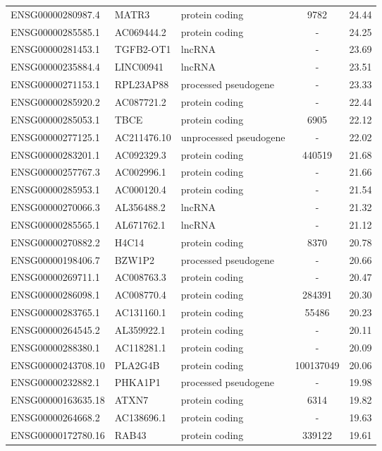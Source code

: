 \begin{longtable}[t]{lllcc}
\addlinespace
ENSG00000280987.4 & MATR3 & protein coding & 9782 & 24.44\\
ENSG00000285585.1 & AC069444.2 & protein coding & - & 24.25\\
ENSG00000281453.1 & TGFB2-OT1 & lncRNA & - & 23.69\\
ENSG00000235884.4 & LINC00941 & lncRNA & - & 23.51\\
ENSG00000271153.1 & RPL23AP88 & processed pseudogene & - & 23.33\\
\addlinespace
ENSG00000285920.2 & AC087721.2 & protein coding & - & 22.44\\
ENSG00000285053.1 & TBCE & protein coding & 6905 & 22.12\\
ENSG00000277125.1 & AC211476.10 & unprocessed pseudogene & - & 22.02\\
ENSG00000283201.1 & AC092329.3 & protein coding & 440519 & 21.68\\
ENSG00000257767.3 & AC002996.1 & protein coding & - & 21.66\\
\addlinespace
ENSG00000285953.1 & AC000120.4 & protein coding & - & 21.54\\
ENSG00000270066.3 & AL356488.2 & lncRNA & - & 21.32\\
ENSG00000285565.1 & AL671762.1 & lncRNA & - & 21.12\\
ENSG00000270882.2 & H4C14 & protein coding & 8370 & 20.78\\
ENSG00000198406.7 & BZW1P2 & processed pseudogene & - & 20.66\\
\addlinespace
ENSG00000269711.1 & AC008763.3 & protein coding & - & 20.47\\
ENSG00000286098.1 & AC008770.4 & protein coding & 284391 & 20.30\\
ENSG00000283765.1 & AC131160.1 & protein coding & 55486 & 20.23\\
ENSG00000264545.2 & AL359922.1 & protein coding & - & 20.11\\
ENSG00000288380.1 & AC118281.1 & protein coding & - & 20.09\\
\addlinespace
ENSG00000243708.10 & PLA2G4B & protein coding & 100137049 & 20.06\\
ENSG00000232882.1 & PHKA1P1 & processed pseudogene & - & 19.98\\
ENSG00000163635.18 & ATXN7 & protein coding & 6314 & 19.82\\
ENSG00000264668.2 & AC138696.1 & protein coding & - & 19.63\\
ENSG00000172780.16 & RAB43 & protein coding & 339122 & 19.61\\*
\end{longtable}
\endgroup{}
